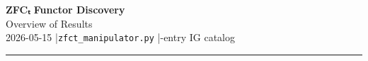 \documentclass[12pt,a4paper]{article}
\begin{document}
\begin{center}
  {\LARGE\bfseries ZFCₜ Functor Discovery}\\[0.4em]
  {\large Overview of Results}\\[1em]
  {\small 2026-05-15 \quad|\quad \texttt{zfct\_manipulator.py} \quad|-entry IG catalog}
\end{center}

\bigskip
\hrule
\bigskip


\end{document}
